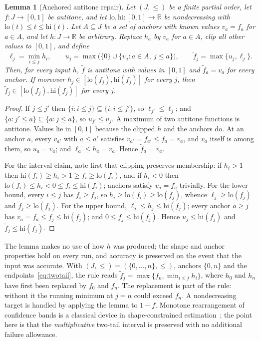 \documentclass[11pt]{article}
\newtheorem{lemma}[theorem]{Lemma}
\theoremstyle{remark}
\begin{document}
\begin{lemma}[Anchored antitone repair]\label{lem:repair}
Let \((J,\le)\) be a finite partial order, let \(f\colon J\to[0,1]\) be
antitone, and let \(\mathrm{lo},\mathrm{hi}\colon[0,1]\to\mathbb R\) be
nondecreasing with \(\mathrm{lo}(t)\le t\le\mathrm{hi}(t)\). Let
\(A\subseteq J\) be a set of anchors with known values
\(v_a=f_a\) for \(a\in A\), and let \(h\colon J\to\mathbb R\) be arbitrary.
Replace \(h_a\) by \(v_a\) for \(a\in A\), clip all other values to
\([0,1]\), and define
\[
 \ell_j=\min_{i\le j}h_i,\qquad
 u_j=\max\bigl(\{0\}\cup\{v_a:a\in A,\ j\le a\}\bigr),
 \qquad \widetilde f_j=\max\{u_j,\ell_j\}.
\]
Then, for every input \(h\), \(\widetilde f\) is antitone with values in
\([0,1]\) and \(\widetilde f_a=v_a\) for every anchor. If moreover
\(h_j\in[\mathrm{lo}(f_j),\mathrm{hi}(f_j)]\) for every \(j\), then
\(\widetilde f_j\in[\mathrm{lo}(f_j),\mathrm{hi}(f_j)]\) for every \(j\).
\end{lemma}
\begin{proof}
If \(j\le j'\) then \(\{i:i\le j\}\subseteq\{i:i\le j'\}\), so
\(\ell_{j'}\le\ell_j\); and \(\{a:j'\le a\}\subseteq\{a:j\le a\}\), so
\(u_{j'}\le u_j\). A maximum of two antitone functions is antitone.
Values lie in \([0,1]\) because the clipped \(h\) and the anchors do.
At an anchor \(a\), every \(v_{a'}\) with \(a\le a'\) satisfies
\(v_{a'}=f_{a'}\le f_a=v_a\), and \(v_a\) itself is among them, so
\(u_a=v_a\); and \(\ell_a\le h_a=v_a\). Hence \(\widetilde f_a=v_a\).

For the interval claim, note first that clipping preserves membership:
if \(h_i>1\) then \(\mathrm{hi}(f_i)\ge h_i>1\ge f_i\ge\mathrm{lo}(f_i)\),
and if \(h_i<0\) then \(\mathrm{lo}(f_i)\le h_i<0\le f_i\le\mathrm{hi}(f_i)\);
anchors satisfy \(v_a=f_a\) trivially. For the lower bound, every
\(i\le j\) has \(f_i\ge f_j\), so
\(h_i\ge\mathrm{lo}(f_i)\ge\mathrm{lo}(f_j)\), whence
\(\ell_j\ge\mathrm{lo}(f_j)\) and \(\widetilde f_j\ge\mathrm{lo}(f_j)\).
For the upper bound, \(\ell_j\le h_j\le\mathrm{hi}(f_j)\); every anchor
\(a\ge j\) has \(v_a=f_a\le f_j\le\mathrm{hi}(f_j)\); and
\(0\le f_j\le\mathrm{hi}(f_j)\). Hence \(u_j\le\mathrm{hi}(f_j)\) and
\(\widetilde f_j\le\mathrm{hi}(f_j)\).
\end{proof}

The lemma makes no use of how \(h\) was produced; the shape and anchor
properties hold on every run, and accuracy is preserved on the event
that the input was accurate. With \((J,\le)=(\{0,\ldots,n\},\le)\),
anchors \(\{0,n\}\) and the endpoints~\eqref{eq:twotail}, the rule reads
\(\widetilde f_j=\max\{f_n,\min_{i\le j}h_i\}\), where \(h_0\) and \(h_n\)
have first been replaced by \(f_0\) and \(f_n\). The replacement is part
of the rule: without it the running minimum at \(j=n\) could exceed
\(f_n\). A nondecreasing target is handled by applying the
lemma to \(1-f\). Monotone rearrangement of confidence bands is a
classical device in shape-constrained
estimation~\cite{robertson1988,chernozhukov2009}; the point here is that
the \emph{multiplicative} two-tail interval is preserved with no
additional failure allowance.
\end{document}
